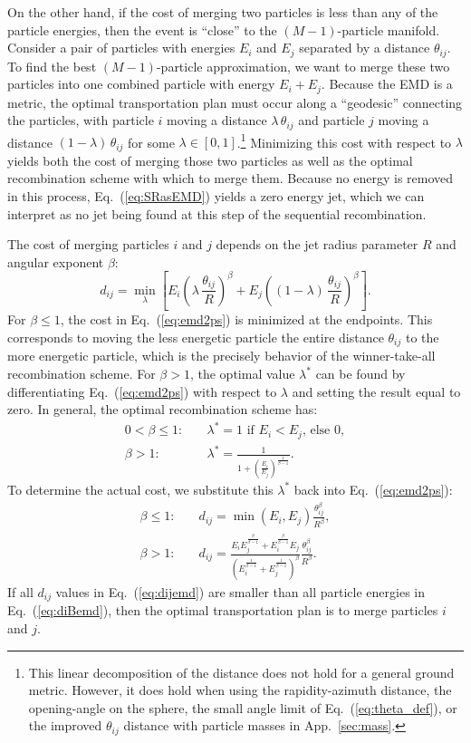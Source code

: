 \documentclass[letterpaper,11pt]{article}
\DeclareRobustCommand{\App}[1]{App.~\ref{#1}}
\DeclareRobustCommand{\Eq}[1]{Eq.~(\ref{#1})}
\begin{document}
On the other hand, if the cost of merging two particles is less than any of the particle energies, then the event is ``close'' to the $(M-1)$-particle manifold.
%
Consider a pair of particles with energies $E_i$ and $E_j$ separated by a distance $\theta_{ij}$.
%
To find the best $(M-1)$-particle approximation, we want to merge these two particles into one combined particle with energy $E_i + E_j$.
%
Because the EMD is a metric, the optimal transportation plan must occur along a ``geodesic'' connecting the particles, with particle $i$ moving a distance $\lambda\,\theta_{ij}$ and particle $j$ moving a distance $(1-\lambda)\,\theta_{ij}$ for some $\lambda \in [0,1]$.\footnote{This linear decomposition of the distance does not hold for a general ground metric. However, it does hold when using the rapidity-azimuth distance, the opening-angle on the sphere, the small angle limit of \Eq{eq:theta_def}, or the improved $\theta_{ij}$ distance with particle masses in \App{sec:mass}.}
%
Minimizing this cost with respect to $\lambda$ yields both the cost of merging those two particles as well as the optimal recombination scheme with which to merge them.
%
Because no energy is removed in this process, \Eq{eq:SRasEMD} yields a zero energy jet, which we can interpret as no jet being found at this step of the sequential recombination.


The cost of merging particles $i$ and $j$ depends on the jet radius parameter $R$ and angular exponent $\beta$:
%
\begin{equation}\label{eq:emd2ps}
d_{ij} = \min_\lambda\left[E_i \left(\lambda \,\frac{\theta_{ij}}{R}\right)^\beta + E_j \left((1-\lambda) \,\frac{\theta_{ij}}{R}\right)^\beta\right].
\end{equation}
%
For $\beta \le 1$, the cost in \Eq{eq:emd2ps} is minimized at the endpoints.
%
This corresponds to moving the less energetic particle the entire distance $\theta_{ij}$ to the more energetic particle, which is the precisely behavior of the winner-take-all recombination scheme.
%
For $\beta>1$, the optimal value $\lambda^*$ can be found by differentiating \Eq{eq:emd2ps} with respect to $\lambda$ and setting the result equal to zero.
%
In general, the optimal recombination scheme has:
%
\begin{align}
0 < \beta \le 1:& \quad \lambda^* = 1 \text{ if $E_i < E_j$, else } 0, \nonumber \\
\beta>1: & \quad \lambda^* = \frac{1}{1 + \left(\frac{E_i}{E_j}\right)^{\frac{1}{\beta-1}}}.
\label{eq:opt_recomb}
\end{align}
%
To determine the actual cost, we substitute this $\lambda^*$ back into \Eq{eq:emd2ps}:
%
\begin{align}
\beta \le 1:&\quad d_{ij} = \min(E_i, E_j)\frac{\theta_{ij}^\beta}{R^\beta}, \nonumber\\
\beta>1: & \quad d_{ij} = \frac{E_i E_j^{\frac{\beta}{\beta-1} }+ E_i^{\frac{\beta}{\beta-1}}E_j}{\left(E_i^{\frac{1}{\beta-1}} + E_j^{\frac{1}{\beta-1}}\right)^\beta}\frac{\theta_{ij}^\beta}{R^\beta}.
\label{eq:dijemd}
\end{align}
%
If all $d_{ij}$ values in \Eq{eq:dijemd} are smaller than all particle energies in \Eq{eq:diBemd}, then the optimal transportation plan is to merge particles $i$ and $j$.
\end{document}
